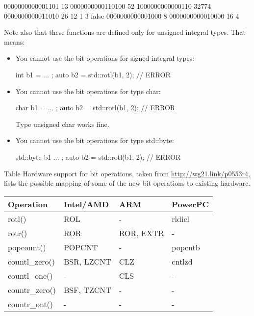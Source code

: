 \begin{shell}
0000000000001101    13
0000000000110100    52
1000000000000110 32774
0000000000011010    26
12
1 
3
false
0000000000001000     8
0000000000010000    16
4
\end{shell}

Note also that these functions are defined only for unsigned integral types. That means:

\begin{itemize}
\item 
You cannot use the bit operations for signed integral types:

\begin{cpp}
int b1 = ... ;
auto b2 = std::rotl(b1, 2); // ERROR
\end{cpp}

\item
You cannot use the bit operations for type char:

\begin{cpp}
char b1 = ... ;
auto b2 = std::rotl(b1, 2); // ERROR
\end{cpp}

Type unsigned char works fine.

\item
You cannot use the bit operations for type std::byte:

\begin{cpp}
std::byte b1{ ... };
auto b2 = std::rotl(b1, 2); // ERROR
\end{cpp}

\end{itemize}

Table Hardware support for bit operations, taken from \url{http://wg21.link/p0553r4}, lists the possible mapping of some of the new bit operations to existing hardware.


\begin{longtable}[c]{|l|l|l|l|}
\hline
\textbf{Operation} & \textbf{Intel/AMD} & \textbf{ARM} & \textbf{PowerPC} \\ \hline
\endfirsthead
%
\endhead
%
rotl()             & ROL                & -            & rldicl           \\ \hline
rotr()             & ROR                & ROR, EXTR    & -                \\ \hline
popcount()         & POPCNT             & -            & popcntb          \\ \hline
countl\_zero()     & BSR, LZCNT         & CLZ          & cntlzd           \\ \hline
countl\_one()      & -                  & CLS          & -                \\ \hline
countr\_zero()     & BSF, TZCNT         & -            & -                \\ \hline
countr\_ont()      & -                  & -            & -                \\ \hline
\end{longtable}

